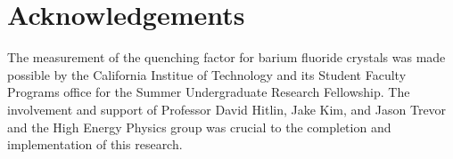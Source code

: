\documentclass{article}
\begin{document}
\section{Acknowledgements}

The measurement of the quenching factor for barium fluoride crystals was made possible by the California Institue of Technology and its Student Faculty Programs office for the Summer Undergraduate Research Fellowship. The involvement and support of Professor David Hitlin, Jake Kim, and Jason Trevor and the High Energy Physics group was crucial to the completion and implementation of this research. 
\end{document}
